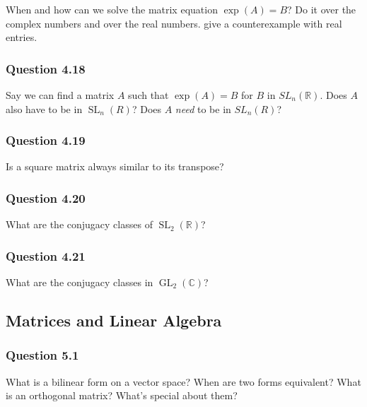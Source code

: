When and how can we solve the matrix equation \(\exp(A) = B\)? Do it
over the complex numbers and over the real numbers. give a
counterexample with real entries.

\hypertarget{question-4.18}{%
\subsubsection{Question 4.18}\label{question-4.18}}

Say we can find a matrix \(A\) such that \(\exp(A) = B\) for \(B\) in
\(SL_n({\mathbb{R}})\). Does \(A\) also have to be in
\({\operatorname{SL}}_n(R)\)? Does \(A\) \emph{need} to be in
\(SL_n(R)\)?

\hypertarget{question-4.19}{%
\subsubsection{Question 4.19}\label{question-4.19}}

Is a square matrix always similar to its transpose?

\hypertarget{question-4.20}{%
\subsubsection{Question 4.20}\label{question-4.20}}

What are the conjugacy classes of
\({\operatorname{SL}}_2({\mathbb{R}})\)?

\hypertarget{question-4.21}{%
\subsubsection{Question 4.21}\label{question-4.21}}

What are the conjugacy classes in \(\operatorname{GL}_2({\mathbb{C}})\)?

\hypertarget{matrices-and-linear-algebra}{%
\subsection{Matrices and Linear
Algebra}\label{matrices-and-linear-algebra}}

\hypertarget{question-5.1}{%
\subsubsection{Question 5.1}\label{question-5.1}}

What is a bilinear form on a vector space? When are two forms
equivalent? What is an orthogonal matrix? What's special about them?

